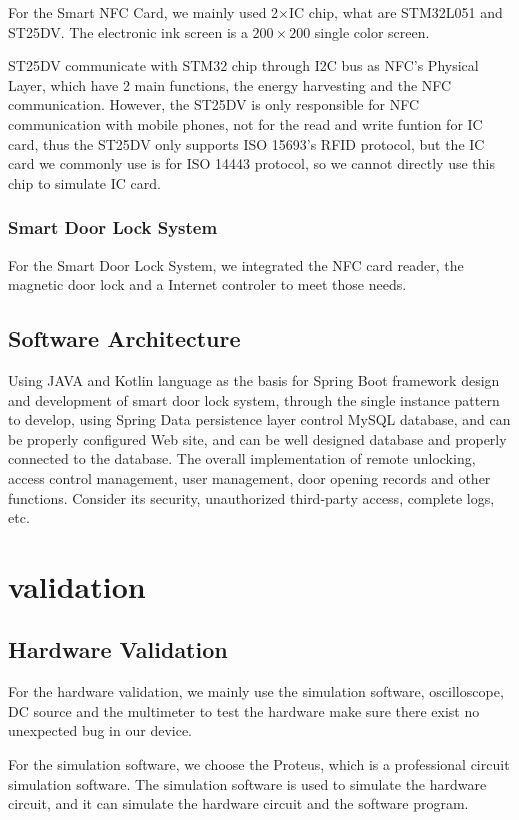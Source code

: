 \documentclass[11pt, a4paper]{article}
\begin{document}
For the Smart NFC Card, we mainly used 2$\times$IC chip, what are STM32L051 and ST25DV. The electronic ink screen is a $200 \times 200$ single color screen.

ST25DV communicate with STM32 chip through I2C bus as NFC's Physical Layer, which have 2 main functions, the energy harvesting and the NFC communication.
However, the ST25DV is only responsible for NFC communication with mobile phones, not for the read and write funtion for IC card, thus the ST25DV only supports ISO 15693's RFID protocol, but the IC card we commonly use is for ISO 14443 protocol, so we cannot directly use this chip to simulate IC card.


\subsubsection{Smart Door Lock System}

For the Smart Door Lock System, we integrated the NFC card reader, the magnetic door lock and a Internet controler to meet those needs.


\subsection{Software Architecture}
Using JAVA and Kotlin language as the basis for Spring Boot framework design and development of smart door lock system, through the single instance pattern to develop, using Spring Data persistence layer control MySQL database, and can be properly configured Web site, and can be well designed database and properly connected to the database.  The overall implementation of remote unlocking, access control management, user management, door opening records and other functions.  Consider its security, unauthorized third-party access, complete logs, etc.

\section{validation}
\subsection{Hardware Validation}

For the hardware validation, we mainly use the simulation software, oscilloscope, DC source and the multimeter to test the hardware make sure there exist no unexpected bug in our device.

For the simulation software, we choose the Proteus, which is a professional circuit simulation software.
The simulation software is used to simulate the hardware circuit, and it can simulate the hardware circuit and the software program.
\end{document}
